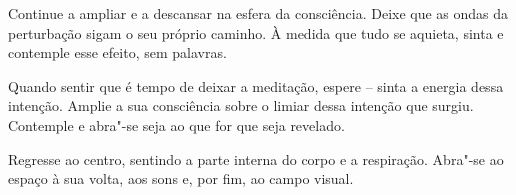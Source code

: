 Continue a ampliar e a descansar na esfera da consciência. Deixe que as ondas da
perturbação sigam o seu próprio caminho. À medida que tudo se aquieta, sinta e
contemple esse efeito, sem palavras.

Quando sentir que é tempo de deixar a meditação, espere -- sinta a energia dessa
intenção. Amplie a sua consciência sobre o limiar dessa intenção que surgiu.
Contemple e abra"-se seja ao que for que seja revelado.

Regresse ao centro, sentindo a parte interna do corpo e a respiração. Abra"-se
ao espaço à sua volta, aos sons e, por fim, ao campo visual.
